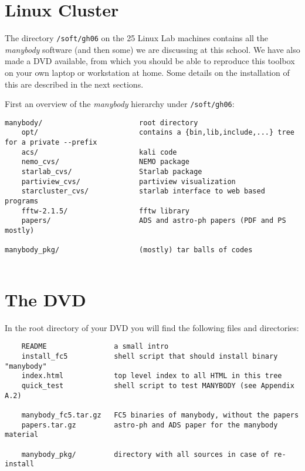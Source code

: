 {\section{Linux Cluster}

The directory {\tt /soft/gh06} on the 25 Linux Lab machines
contains all the {\it manybody} software (and then some)  
we are discussing at this school. We have
also made a DVD available, from which you should be able to reproduce this
toolbox on your own laptop or workstation at home. 
Some details on the installation of this are described in the next sections.

First an overview of the {\it manybody} hierarchy under {\tt /soft/gh06}:

\footnotesize
\begin{verbatim}
manybody/                       root directory
    opt/                        contains a {bin,lib,include,...} tree for a private --prefix
    acs/                        kali code
    nemo_cvs/                   NEMO package
    starlab_cvs/                Starlab package
    partiview_cvs/              partiview visualization 
    starcluster_cvs/            starlab interface to web based programs
    fftw-2.1.5/                 fftw library 
    papers/                     ADS and astro-ph papers (PDF and PS mostly)

manybody_pkg/                   (mostly) tar balls of codes 
    
\end{verbatim}
\normalsize



\section{The DVD}
In the root directory of your DVD you will find the following files and directories:

\begin{verbatim}
    README                a small intro
    install_fc5           shell script that should install binary "manybody"
    index.html            top level index to all HTML in this tree
    quick_test            shell script to test MANYBODY (see Appendix A.2)

    manybody_fc5.tar.gz   FC5 binaries of manybody, without the papers
    papers.tar.gz         astro-ph and ADS paper for the manybody material

    manybody_pkg/         directory with all sources in case of re-install
\end{verbatim}

}
